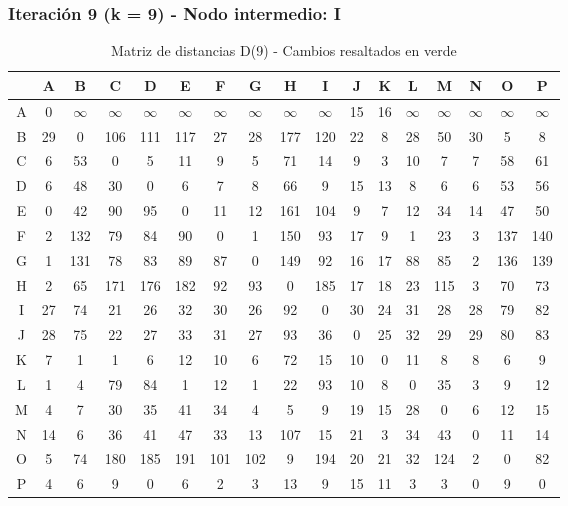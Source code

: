 \documentclass[12pt]{article}
\begin{document}
\subsubsection{Iteración 9 (k = 9) - Nodo intermedio: I}
\begin{table}[h!]
\centering
\begin{tabular}{|c|c|c|c|c|c|c|c|c|c|c|c|c|c|c|c|c|}
\hline
 & A & B & C & D & E & F & G & H & I & J & K & L & M & N & O & P \\\hline
A & 0 & $\infty$ & $\infty$ & $\infty$ & $\infty$ & $\infty$ & $\infty$ & $\infty$ & $\infty$ & 15 & 16 & $\infty$ & $\infty$ & $\infty$ & $\infty$ & $\infty$ \\\hline
B & 29 & 0 & 106 & 111 & 117 & 27 & 28 & 177 & 120 & 22 & 8 & 28 & 50 & 30 & 5 & 8 \\\hline
C & 6 & 53 & 0 & 5 & 11 & 9 & 5 & 71 & 14 & 9 & 3 & 10 & 7 & 7 & 58 & 61 \\\hline
D & 6 & 48 & \cellcolor{lightgreen} 30 & 0 & 6 & 7 & 8 & 66 & 9 & 15 & 13 & 8 & 6 & 6 & 53 & 56 \\\hline
E & 0 & 42 & 90 & 95 & 0 & 11 & 12 & 161 & 104 & 9 & 7 & 12 & 34 & 14 & 47 & 50 \\\hline
F & 2 & 132 & 79 & 84 & 90 & 0 & 1 & 150 & 93 & 17 & 9 & 1 & 23 & 3 & 137 & 140 \\\hline
G & 1 & 131 & 78 & 83 & 89 & 87 & 0 & 149 & 92 & 16 & 17 & 88 & 85 & 2 & 136 & 139 \\\hline
H & 2 & 65 & 171 & 176 & 182 & 92 & 93 & 0 & 185 & 17 & 18 & 23 & 115 & 3 & 70 & 73 \\\hline
I & 27 & 74 & 21 & 26 & 32 & 30 & 26 & 92 & 0 & 30 & 24 & 31 & 28 & 28 & 79 & 82 \\\hline
J & 28 & 75 & 22 & 27 & 33 & 31 & 27 & 93 & 36 & 0 & 25 & 32 & 29 & 29 & 80 & 83 \\\hline
K & 7 & 1 & 1 & 6 & 12 & 10 & 6 & 72 & 15 & 10 & 0 & 11 & 8 & 8 & 6 & 9 \\\hline
L & 1 & 4 & 79 & 84 & 1 & 12 & 1 & 22 & 93 & 10 & 8 & 0 & 35 & 3 & 9 & 12 \\\hline
M & 4 & 7 & \cellcolor{lightgreen} 30 & \cellcolor{lightgreen} 35 & \cellcolor{lightgreen} 41 & 34 & 4 & 5 & 9 & 19 & 15 & 28 & 0 & 6 & 12 & 15 \\\hline
N & 14 & 6 & \cellcolor{lightgreen} 36 & \cellcolor{lightgreen} 41 & \cellcolor{lightgreen} 47 & 33 & 13 & \cellcolor{lightgreen} 107 & 15 & 21 & 3 & 34 & \cellcolor{lightgreen} 43 & 0 & 11 & 14 \\\hline
O & 5 & 74 & 180 & 185 & 191 & 101 & 102 & 9 & 194 & 20 & 21 & 32 & 124 & 2 & 0 & 82 \\\hline
P & 4 & 6 & 9 & 0 & 6 & 2 & 3 & 13 & 9 & 15 & 11 & 3 & 3 & 0 & 9 & 0 \\\hline
\end{tabular}
\caption{Matriz de distancias D(9) - Cambios resaltados en verde}
\end{table}
\end{document}
